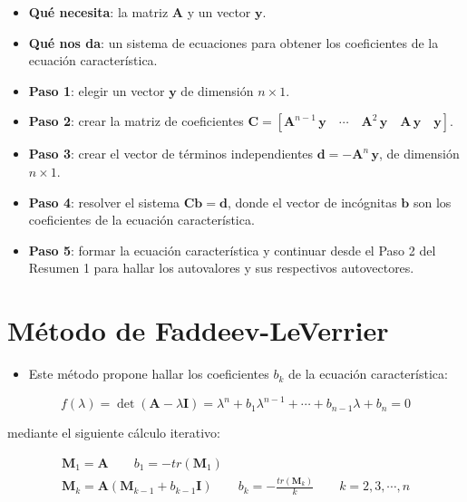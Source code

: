 \documentclass[openany]{book}
\providecommand{\tightlist}{%
  \setlength{\itemsep}{0pt}\setlength{\parskip}{0pt}}
\begin{document}
\begin{itemize}
\tightlist
\item
  \textbf{Qué necesita}: la matriz \(\mathbf{A}\) y un vector \(\mathbf{y}\).
\item
  \textbf{Qué nos da}: un sistema de ecuaciones para obtener los coeficientes de la ecuación característica.
\item
  \textbf{Paso 1}: elegir un vector \(\mathbf{y}\) de dimensión \(n \times 1\).
\item
  \textbf{Paso 2}: crear la matriz de coeficientes \(\mathbf{C} = [\mathbf{A}^{n-1} \, \mathbf{y} \quad \cdots \quad \mathbf{A}^2 \, \mathbf{y} \quad \mathbf{A} \, \mathbf{y} \quad \mathbf{y}]\).
\item
  \textbf{Paso 3}: crear el vector de términos independientes \(\mathbf{d} = - \mathbf{A}^n \, \mathbf{y}\), de dimensión \(n \times 1\).
\item
  \textbf{Paso 4}: resolver el sistema \(\mathbf{Cb=d}\), donde el vector de incógnitas \(\mathbf{b}\) son los coeficientes de la ecuación característica.
\item
  \textbf{Paso 5}: formar la ecuación característica y continuar desde el Paso 2 del Resumen 1 para hallar los autovalores y sus respectivos autovectores.
\end{itemize}

\hypertarget{muxe9todo-de-faddeev-leverrier}{%
\section{Método de Faddeev-LeVerrier}\label{muxe9todo-de-faddeev-leverrier}}

\begin{itemize}
\tightlist
\item
  Este método propone hallar los coeficientes \(b_k\) de la ecuación característica:
\end{itemize}

\[
f(\lambda) = \det(\textbf{A} - \lambda \textbf{I}) = \lambda^n + b_1 \lambda^{n-1} + \cdots + b_{n-1} \lambda + b_n = 0
\]

mediante el siguiente cálculo iterativo:

\begin{gather*}
\textbf{M}_1 = \textbf{A} \qquad b_1 = - tr(\textbf{M}_1) \\
\textbf{M}_k = \textbf{A} (\textbf{M}_{k-1} + b_{k-1} \textbf{I}) \qquad b_k = - \frac{tr(\textbf{M}_k)}{k} \qquad k = 2, 3, \cdots, n\\
\end{gather*}
\end{document}
